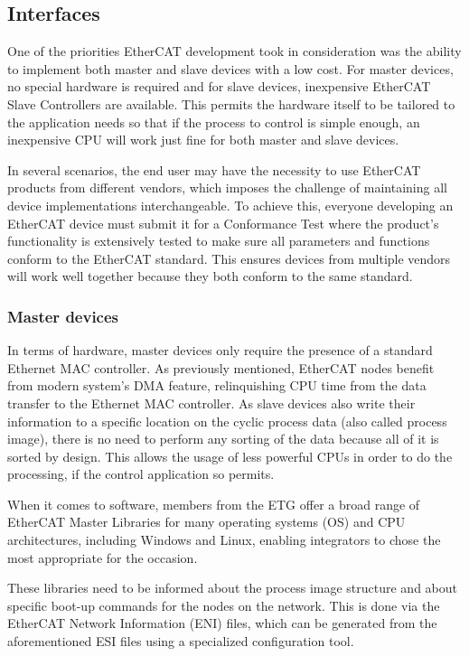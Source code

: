 \subsection{Interfaces}

One of the priorities EtherCAT development took in consideration was the ability to implement both master and slave devices with a low cost.
For master devices, no special hardware is required and for slave devices, inexpensive EtherCAT Slave Controllers are available.
This permits the hardware itself to be tailored to the application needs so that if the process to control is simple enough, an inexpensive CPU will work just fine for both master and slave devices.

In several scenarios, the end user may have the necessity to use EtherCAT products from different vendors, which imposes the challenge of maintaining all device implementations interchangeable.
To achieve this, everyone developing an EtherCAT device must submit it for a Conformance Test where the product's functionality is extensively tested to make sure all parameters and functions conform to the EtherCAT standard.
This ensures devices from multiple vendors will work well together because they both conform to the same standard.

\subsubsection{Master devices}

In terms of hardware, master devices only require the presence of a standard Ethernet MAC controller.
As previously mentioned, EtherCAT nodes benefit from modern system's DMA feature, relinquishing CPU time from the data transfer to the Ethernet MAC controller.
As slave devices also write their information to a specific location on the cyclic process data (also called process image), there is no need to perform any sorting of the data because all of it is sorted by design.
This allows the usage of less powerful CPUs in order to do the processing, if the control application so permits.

When it comes to software, members from the ETG offer a broad range of EtherCAT Master Libraries for many operating systems (OS) and CPU architectures, including Windows\textregistered{} and Linux\textregistered{}, enabling integrators to chose the most appropriate for the occasion.

These libraries need to be informed about the process image structure and about specific boot-up commands for the nodes on the network.
This is done via the EtherCAT Network Information (ENI) files, which can be generated from the aforementioned ESI files using a specialized configuration tool.

